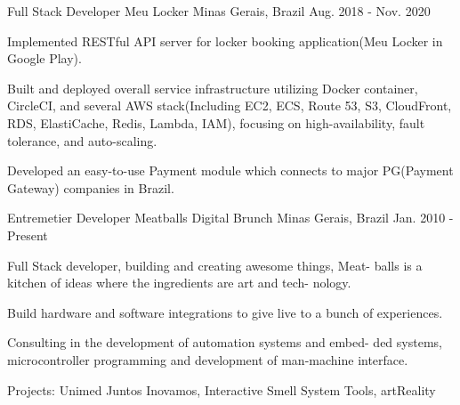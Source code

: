 \begin{cventries}
  \cventry
    {Full Stack Developer} %
    {Meu Locker} %
    {Minas Gerais, Brazil} %
    {Aug. 2018 - Nov. 2020} %
    {
      \begin{cvitems} %
        \item {Implemented RESTful API server for locker booking application(Meu Locker in Google Play).}
        \item {Built and deployed overall service infrastructure utilizing Docker container, CircleCI, and several AWS stack(Including EC2, ECS, Route 53, S3, CloudFront, RDS, ElastiCache, Redis, Lambda, IAM), focusing on high-availability, fault tolerance, and auto-scaling.}
        \item {Developed an easy-to-use Payment module which connects to major PG(Payment Gateway) companies in Brazil.}
      \end{cvitems}
    }

  \cventry
    {Entremetier Developer} %
    {Meatballs Digital Brunch} %
    {Minas Gerais, Brazil} %
    {Jan. 2010 - Present} %
    {
      \begin{cvitems} %
        \item {Full Stack developer, building and creating awesome things, Meat-
balls is a kitchen of ideas where the ingredients are art and tech-
nology.}
        \item {Build hardware and software integrations to give live to a bunch of
experiences.}
		\item {Consulting in the development of automation systems and embed-
ded systems, microcontroller programming and development of
man-machine interface.}
		\item {Projects: Unimed Juntos Inovamos, Interactive Smell System Tools, artReality}
      \end{cvitems}
    }


\end{cventries}
